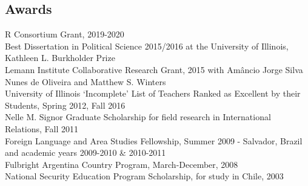\documentclass[margin, 10pt]{CVStyleTemplate}\usepackage[]{graphicx}\usepackage[]{color}
\begin{document}
\begin{resume}



%
%

\section{Awards}%

R Consortium Grant, 2019-2020\\[6pt]
Best Dissertation in Political Science 2015/2016 at the University of Illinois, Kathleen L. Burkholder Prize  \\[6pt]
Lemann Institute Collaborative Research Grant, 2015 with Am\^{a}ncio Jorge Silva Nunes de Oliveira and Matthew S. Winters\\[6pt]%
University of Illinois `Incomplete' List of Teachers Ranked as Excellent by their Students, Spring 2012, Fall 2016\\[6pt]%
Nelle M. Signor Graduate Scholarship for field research in International Relations, Fall 2011\\[6pt]%
Foreign Language and Area Studies Fellowship, Summer 2009 - Salvador, Brazil and academic years 2009-2010 \& 2010-2011\\[6pt]%
Fulbright Argentina Country Program, March-December, 2008\\[6pt]%
National Security Education Program Scholarship, for study in Chile, 2003\\[6pt]%





\end{resume}
\end{document}
